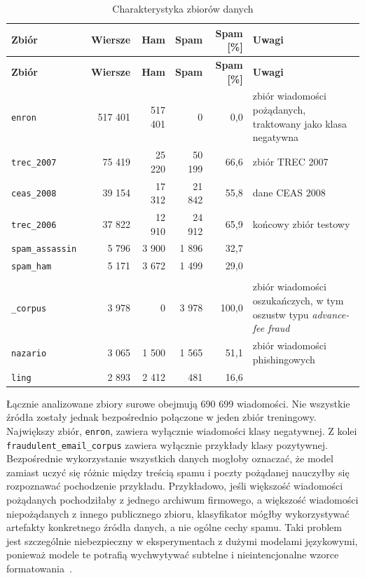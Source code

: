 {\small
\begin{longtable}{p{}rrrrp{}}
\caption{Charakterystyka zbiorów danych}
\label{tab:raw-dataset-inventory}\\
\hline
\textbf{Zbiór} & \textbf{Wiersze} & \textbf{Ham} & \textbf{Spam} & \textbf{Spam [\%]} & \textbf{Uwagi} \\
\hline
\endfirsthead
\hline
\textbf{Zbiór} & \textbf{Wiersze} & \textbf{Ham} & \textbf{Spam} & \textbf{Spam [\%]} & \textbf{Uwagi} \\
\hline
\endhead
\hline
\endfoot
\texttt{enron}~\autocite{kaggle-enron-email-dataset} & 517 401 & 517 401 & 0 & 0,0 & zbiór wiadomości pożądanych, traktowany jako klasa negatywna \\
\texttt{trec\_2007}~\autocite{kaggle-trec-2007} & 75 419 & 25 220 & 50 199 & 66,6 & zbiór TREC 2007 \\
\texttt{ceas\_2008}~\autocite{kaggle-ceas-2008} & 39 154 & 17 312 & 21 842 & 55,8 & dane CEAS 2008 \\
\texttt{trec\_2006}~\autocite{kaggle-trec-2006} & 37 822 & 12 910 & 24 912 & 65,9 & końcowy zbiór testowy \\
\texttt{spam\_assassin}~\autocite{kaggle-spam-assassin-email-classification} & 5 796 & 3 900 & 1 896 & 32,7 & \\
\texttt{spam\_ham}~\autocite{kaggle-spam-mails-dataset} & 5 171 & 3 672 & 1 499 & 29,0 & \\
\begin{tabular}[t]{@{}l@{}}\texttt{fraudulent\_email}\\\texttt{\_corpus}\end{tabular}~\autocite{kaggle-fraudulent-email-corpus} & 3 978 & 0 & 3 978 & 100,0 & zbiór wiadomości oszukańczych, w tym oszustw typu \emph{advance-fee fraud}~\autocite{longe-fraudulent-cyber-activities} \\
\texttt{nazario}~\autocite{kaggle-nazario-5-datatest} & 3 065 & 1 500 & 1 565 & 51,1 & zbiór wiadomości phishingowych \\
\texttt{ling}~\autocite{kaggle-lingspam-dataset} & 2 893 & 2 412 & 481 & 16,6 & \\
\end{longtable}
}

Łącznie analizowane zbiory surowe obejmują 690 699 wiadomości. Nie wszystkie źródła zostały jednak
bezpośrednio połączone w jeden zbiór treningowy. Największy zbiór, \texttt{enron}, zawiera
wyłącznie wiadomości klasy negatywnej. Z kolei \texttt{fraudulent\_email\_corpus}
zawiera wyłącznie przykłady klasy pozytywnej. Bezpośrednie wykorzystanie wszystkich danych
mogłoby oznaczać, że model zamiast uczyć się różnic między treścią
spamu i poczty pożądanej nauczyłby się rozpoznawać pochodzenie przykładu.
Przykładowo, jeśli większość wiadomości pożądanych pochodziłaby z jednego
archiwum firmowego, a większość wiadomości niepożądanych z innego publicznego
zbioru, klasyfikator mógłby wykorzystywać artefakty konkretnego źródła danych,
a nie ogólne cechy spamu. Taki problem jest szczególnie niebezpieczny w
eksperymentach z dużymi modelami językowymi, ponieważ modele te potrafią
wychwytywać subtelne i nieintencjonalne wzorce formatowania~\autocite{shortcut-learning}.

